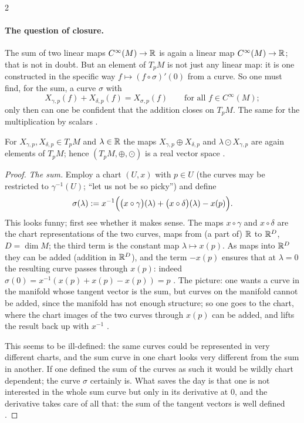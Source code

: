\begin{paracol}{2}
\paragraph{The question of closure.} The sum of two linear maps $C^\infty(M)\to\mathbb{R}$ is again a linear map $C^\infty(M)\to\mathbb{R}$; that is not in doubt. But an element of $T_pM$ is not just any linear map: it is one constructed in the specific way $f\mapsto(f\circ\sigma)'(0)$ from a curve.
So one must find, for the sum, a curve $\sigma$ with
\[
  X_{\gamma,p}(f)+X_{\delta,p}(f)=X_{\sigma,p}(f)\qquad\text{for all }f\in C^\infty(M);
\]
only then can one be confident that the addition closes on $T_pM$. The same for the multiplication by scalars     .

\begin{proposition}\label{prop:tv-closure}
For $X_{\gamma,p},X_{\delta,p}\in T_pM$ and $\lambda\in\mathbb{R}$ the maps $X_{\gamma,p}\oplus X_{\delta,p}$ and $\lambda\odot X_{\gamma,p}$ are again elements of $T_pM$; hence $(T_pM,\oplus,\odot)$ is a real vector space  .
\end{proposition}
\begin{proof}
\emph{The sum.} Employ a chart $(U,x)$ with $p\in U$ (the curves may be restricted to $\gamma^{-1}(U)$; ``let us not be so picky'') and define
\[
  \sigma(\lambda):=x^{-1}\Bigl(\bigl(x\circ\gamma\bigr)(\lambda)+\bigl(x\circ\delta\bigr)(\lambda)-x(p)\Bigr).
\]
This looks funny; first see whether it makes sense. The maps $x\circ\gamma$ and $x\circ\delta$ are the chart representations of the two curves, maps from (a part of) $\mathbb{R}$ to $\mathbb{R}^D$, $D=\dim M$; the third term is the constant map $\lambda\mapsto x(p)$. As maps into $\mathbb{R}^D$ they can be added
(addition in $\mathbb{R}^D$), and the term $-x(p)$ ensures that at $\lambda=0$ the resulting curve passes through $x(p)$: indeed
$\sigma(0)=x^{-1}(x(p)+x(p)-x(p))=p$      .
The picture: one wants a curve in the manifold whose tangent vector is the sum, but curves on the manifold cannot be added, since the manifold has not enough structure; so one goes to the chart, where the chart images of the two curves through $x(p)$ can be added, and lifts the result back up with $x^{-1}$
   .

This seems to be ill-defined: the same curves could be represented in very different charts, and the sum curve in one chart looks very different from the sum in another. If one defined the sum of the curves as such it would be wildly chart dependent; the curve $\sigma$ certainly is. What saves the day is
that one is not interested in the whole sum curve but only in its derivative at $0$, and the derivative takes care of all that: the sum of the tangent vectors is well defined    .


\end{proof}
\end{paracol}
